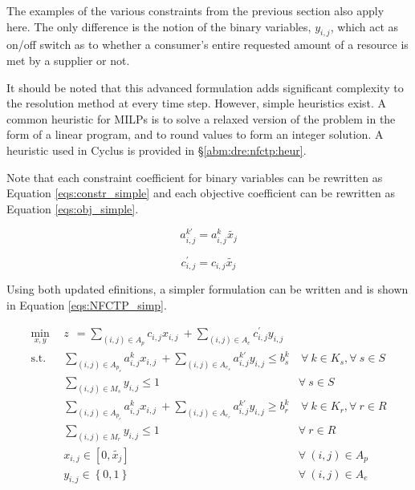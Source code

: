 The examples of the various constraints from the previous section also apply
here. The only difference is the notion of the binary variables, $y_{i,j}$,
which act as on/off switch as to whether a consumer's entire requested amount of
a resource is met by a supplier or not.

It should be noted that this advanced formulation adds significant complexity to
the resolution method at every time step. However, simple heuristics exist. A
common heuristic for MILPs is to solve a relaxed version of the problem in the
form of a linear program, and to round values to form an integer solution. A
heuristic used in Cyclus is provided in \S \ref{abm:dre:nfctp:heur}.

Note that each constraint coefficient for binary variables can be rewritten as
Equation \ref{eqs:constr_simple} and each objective coefficient can be rewritten
as Equation \ref{eqs:obj_simple}.

\begin{equation}\label{eqs:constr_simple}
a^{k\prime}_{i,j} = a^k_{i,j} \tilde{x_j}
\end{equation}

\begin{equation}\label{eqs:obj_simple}
c^{\prime}_{i,j} = c_{i,j} \tilde{x_j}
\end{equation}

Using both updated efinitions, a simpler formulation can be written and is shown
in Equation \ref{eqs:NFCTP_simp}.

\begin{subequations}\label{eqs:NFCTP_simp}
  \begin{align}
    \min_{x, y} \:\: 
    & 
    z \:\: = 
    \sum_{(i, j) \in A_p} c_{i,j} x_{i,j} 
    \: + 
    \sum_{(i, j) \in A_e} c^{\prime}_{i,j} y_{i,j} 
    & 
    \label{eqs:NFCTP_simp_obj} \\
    \text{s.t.} \:\: 
    &
    \sum_{(i, j) \in A_{p_s}} a^k_{i,j} x_{i,j}
    \: + 
    \sum_{(i, j) \in A_{e_s}} a^{k\prime}_{i,j} y_{i,j}
    \leq b^k_s 
    &
    \: 
    \forall \: k \in K_s, 
    \forall \: s \in S 
    \label{eqs:NFCTP_simp_sup} \\
    &
    \sum_{(i, j) \in M_{s}} y_{i,j} \leq 1 
    &
    \forall \: s \in S 
    \label{eqs:NFCTP_simp_mut_sup} \\
    &
    \sum_{(i, j) \in A_{p_r}} a^k_{i,j} x_{i,j}
    \: + 
    \sum_{(i, j) \in A_{e_r}} a^{k\prime}_{i,j} y_{i,j}
    \geq b^k_r 
    &
    \: 
    \forall \: k \in K_r,  
    \forall \: r \in R 
    \label{eqs:NFCTP_simp_req} \\
    &
    \sum_{(i, j) \in M_{r}} y_{i,j} \leq 1 
    &
    \forall \: r \in R 
    \label{eqs:NFCTP_simp_mut_req} \\
    &
    x_{i,j} \in [0, \tilde{x_j}]
    &
    \forall \: (i, j) \in A_p
    \label{eqs:NFCTP_simp_x} \\
    &
    y_{i,j} \in \left\{ 0, 1 \right\}
    &
    \forall \: (i, j) \in A_e
    \label{eqs:NFCTP_simp_y}
  \end{align}
\end{subequations}

